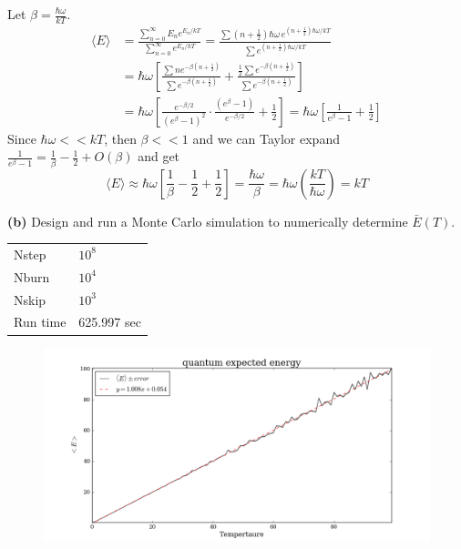 \documentclass{article}
\begin{document}
Let $\beta = \frac{\hbar\omega}{kT}$.
\begin{align*}
	\langle E \rangle 
	&= \frac{\sum\limits_{n=0}^{\infty} E_n e^{E_n/kT}}{\sum\limits_{n=0}^{\infty} e^{E_n/kT}}
	= \frac{\sum (n+\frac{1}{2})\hbar\omega \, e^{(n+\frac{1}{2})\hbar\omega/kT}}{\sum e^{(n+\frac{1}{2})\hbar\omega/kT}} \\
	&= \hbar\omega \left[\frac{\sum n e^{-\beta (n+\frac{1}{2})}}{\sum e^{-\beta (n+\frac{1}{2})}} + \frac{ \frac{1}{2} \sum e^{-\beta (n+\frac{1}{2})} }{\sum e^{-\beta (n+\frac{1}{2})}} \right] \\
	&= \hbar\omega \left[\frac{e^{-\beta/2}}{(e^{\beta} - 1)^2} \cdot \frac{(e^{\beta} - 1)}{e^{-\beta/2}} + \frac{1}{2} \right] 
	= \hbar\omega \left[\frac{1}{e^{\beta} - 1} + \frac{1}{2} \right]
\end{align*}
Since $\hbar\omega << kT$, then $\beta << 1$ and we can Taylor expand $\frac{1}{e^{\beta} - 1} = \frac{1}{\beta} - \frac{1}{2} + O(\beta)$ and get
\begin{equation*}
	\langle E \rangle 
	\approx \hbar\omega \left[\frac{1}{\beta} - \frac{1}{2} + \frac{1}{2} \right]
	= \frac{\hbar\omega}{\beta} = \hbar\omega \left(\frac{kT}{\hbar\omega} \right) = kT
\end{equation*}

\textbf{(b)} Design and run a Monte Carlo simulation to numerically determine $\bar{E}(T)$. \\

\begin{table}[H]
\centering
\begin{tabular}{|l|l|}
	\hline
	Nstep    & $10^8$ \\
	Nburn    & $10^4$ \\
	Nskip    & $10^3$ \\
	Run time & 625.997 sec \\
	\hline
\end{tabular}
\end{table}

\begin{figure}[H]
\begin{center}
\includegraphics[width=16cm]{../output/quantum/expected.png} 
\end{center}
\end{figure}
\end{document}

